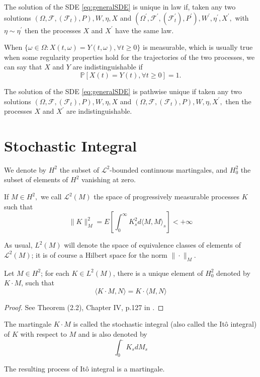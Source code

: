  \begin{definition}
 	The solution of the SDE \eqref{eq:generalSDE} is unique in law if, taken any two solutions $\left(\Omega, \mathcal{F},\left(\mathcal{F}_{t}\right), P\right), W, \eta, X$ and $\left(\Omega^{\prime}, \mathcal{F}^{\prime},\left(\mathcal{F}_{t}^{\prime}\right), P^{\prime}\right), W^{\prime}, \eta^{\prime}, X^{\prime},$ with $\eta \sim \eta^{\prime}$ then the processes $X$ and $X^{\prime}$ have the same law.
 \end{definition}

When $\{\omega \in \Omega: X(t, \omega)=Y(t, \omega), \forall t \geq 0\}$ is measurable, which is usually true when some regularity properties hold for the trajectories of the two processes, we can say that $X$ and $Y$ are indistinguishable if \[ \mathbb{P}[X(t)=Y(t), \forall t \geq 0]=1. \]
\begin{definition}
	The solution of the SDE \eqref{eq:generalSDE} is pathwise unique if taken any two solutions $\left(\Omega, \mathcal{F},\left(\mathcal{F}_{t}\right), P\right), W, \eta, X$ and $\left(\Omega, \mathcal{F},\left(\mathcal{F}_{t}\right), P\right), W, \eta, X^{\prime},$ then the processes $X$ and $X^{\prime}$ are indistinguishable.
\end{definition}
\section{Stochastic Integral}
We denote by $H^{2}$ the subset of $\mathcal{L}^{2}$-bounded continuous martingales, and $H_{0}^{2}$ the subset of elements of $H^{2}$ vanishing at zero.

\begin{definition}
	If $M \in H^{2},$ we call $\mathscr{L}^{2}(M)$ the space of progressively measurable processes $K$ such that
	\[ \|K\|_{M}^{2}=E\left[\int_{0}^{\infty} K_{s}^{2} d\langle M, M\rangle_{s}\right]<+\infty \]
\end{definition}
As usual, $L^{2}(M)$ will denote the space of equivalence classes of elements of $\mathscr{L}^{2}(M)$; it is of course a Hilbert space for the norm $\|\cdot\|_{M}$.
\begin{theorem}
	 Let $M \in H^{2}$; for each $K \in L^{2}(M)$, there is a unique element of $H_{0}^{2}$ denoted by $K \cdot M$, such that \[ \langle K \cdot M, N\rangle=K \cdot\langle M, N\rangle \]
\end{theorem}
\begin{proof}
	See Theorem (2.2), Chapter IV, p.127 in \cite{revuz2013continuous}.
\end{proof}
\begin{definition}
	The martingale $K \cdot M$ is called the stochastic integral (also called the Itô integral) of $K$ with respect to $M$ and is also denoted by
	\[ \int_{0}^{.} K_{s} d M_{s} \]
\end{definition}
The resulting process of Itô integral is a martingale.

